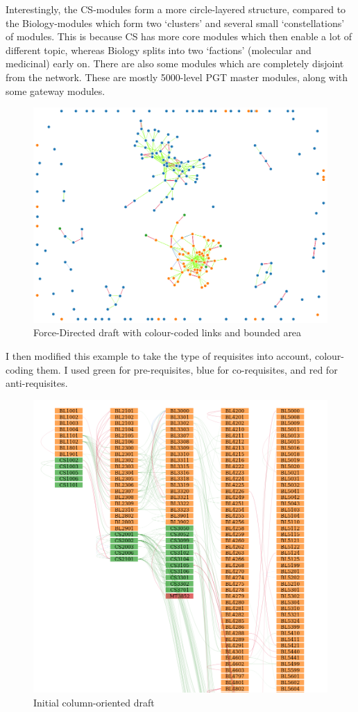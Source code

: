 Interestingly, the CS-modules form a more circle-layered structure, compared to
the Biology-modules which form two `clusters' and several small `constellations'
of modules. This is because CS has more core modules which then enable a lot of
different topic, whereas Biology splits into two `factions' (molecular and
medicinal) early on. There are also some modules which are completely disjoint
from the network. These are mostly 5000-level PGT master modules, along with
some gateway modules.
\begin{figure}
    \centering
    \includegraphics[width=0.8\linewidth]{../Visualisation/screenshots/draft-fd-colour.png}
    \caption{Force-Directed draft with colour-coded links and bounded area}
\end{figure}

I then modified this example to take the type of requisites into account,
colour-coding them. I used green for pre-requisites, blue for co-requisites, and
red for anti-requisites. 
\begin{figure}
    \centering
    \includegraphics[width=\linewidth]{../Visualisation/screenshots/draft-columns.png}
    \caption{Initial column-oriented draft}
\end{figure}

